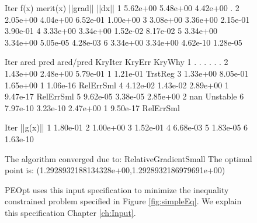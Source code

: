 \begin{figure}
    \begin{lstPeopt}
Iter      f(x)      merit(x)  ||grad||  ||dx||    
1         5.62e+00  5.48e+00  4.42e+00  .         
2         2.05e+00  4.04e+00  6.52e-01  1.00e+00  
3         3.08e+00  3.36e+00  2.15e-01  3.90e-01  
4         3.33e+00  3.34e+00  1.52e-02  8.17e-02  
5         3.34e+00  3.34e+00  5.05e-05  4.28e-03  
6         3.34e+00  3.34e+00  4.62e-10  1.28e-05  
\end{lstPeopt}
    \begin{lstPeopt}
Iter      ared      pred      ared/pred KryIter   KryErr    KryWhy    
1         .         .         .         .         .         .         
2         1.43e+00  2.48e+00  5.79e-01  1         1.21e-01  TrstReg   
3         1.33e+00  8.05e-01  1.65e+00  1         1.06e-16  RelErrSml 
4         4.12e-02  1.43e-02  2.89e+00  1         9.47e-17  RelErrSml 
5         9.62e-05  3.38e-05  2.85e+00  2         nan       Unstable  
6         7.97e-10  3.23e-10  2.47e+00  1         9.50e-17  RelErrSml 
\end{lstPeopt}
    \begin{lstPeopt}
Iter      ||g(x)||  
1         1.80e-01  
2         1.00e+00  
3         1.52e-01  
4         6.68e-03  
5         1.83e-05  
6         1.63e-10  
\end{lstPeopt}
    \begin{lstPeopt}
The algorithm converged due to: RelativeGradientSmall
The optimal point is: (1.2928932188134328e+00,1.2928932186979691e+00)
\end{lstPeopt}
    \caption{PEOpt uses this input specification to minimize the inequality constrained problem specified in Figure \ref{fig:simpleEq}.  We explain this specification Chapter \ref{ch:Input}.} 
    \label{fig:simpleEqOut}
\end{figure}

